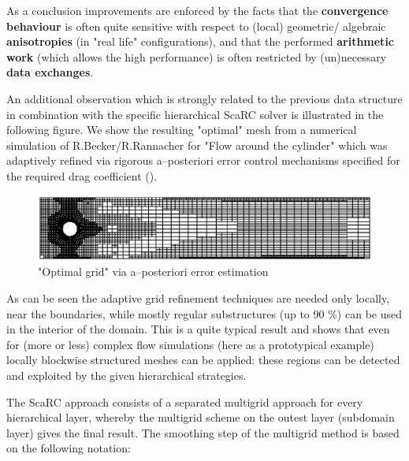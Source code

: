 As a conclusion improvements are enforced by the facts that the {\bf convergence behaviour} is often quite sensitive with respect to (local) geometric/ algebraic {\bf anisotropies} (in "real life" 
configurations), and that the performed {\bf arithmetic work} (which allows the high performance) is often 
restricted by (un)necessary {\bf data exchanges}.


An additional observation which is strongly related to the previous data structure in combination 
with the specific hierarchical {\sc ScaRC} solver is illustrated in the following figure. We show the 
resulting "optimal" mesh from a numerical simulation of R.Becker/R.Rannacher for "Flow around the cylinder" 
which was adaptively refined via rigorous a--posteriori error control mechanisms specified for the required 
drag coefficient (\cite{RannacherBecker1996}).

\begin{figure}[htbp]
\begin{center}
\hspace*{-0.35cm}
 \includegraphics[scale=0.70]{../psfiles/optgrid.eps}
\end{center}
\vspace*{-0.5cm}
\caption{"Optimal grid" via a--posteriori error estimation}
\end{figure}

As can be seen the adaptive grid refinement techniques are needed only locally, near the boundaries, while 
mostly regular substructures (up to 90 \%) can be used in the interior of the domain. 
This is a quite typical result and shows that even for (more or less) complex flow simulations 
(here as a prototypical example) locally blockwise structured meshes can be applied: 
these regions can be detected and exploited by the given hierarchical strategies.

The {\sc ScaRC} approach consists of a separated multigrid approach for every hierarchical
layer, whereby the multigrid scheme on the outest layer (subdomain layer)
gives the final result. The smoothing step of the multigrid method is
based on the following notation:

\vspace*{0.2cm}

